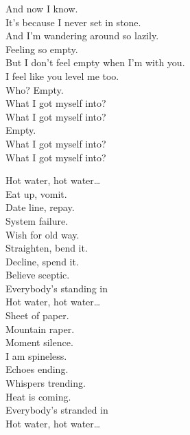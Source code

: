 And now I know. \\
It's because I never set in stone. \\
And I'm wandering around so lazily. \\
Feeling so empty. \\

But I don't feel empty when I'm with you. \\
I feel like you level me too. \\
Who? Empty. \\

What I got myself into? \\
What I got myself into? \\
Empty. \\

What I got myself into? \\
What I got myself into? \\





Hot water, hot water… \\

Eat up, vomit. \\
Date line, repay. \\
System failure. \\
Wish for old way. \\
Straighten, bend it. \\
Decline, spend it. \\
Believe sceptic. \\
Everybody's standing in \\

Hot water, hot water… \\

Sheet of paper. \\
Mountain raper. \\
Moment silence. \\
I am spineless. \\
Echoes ending. \\
Whispers trending. \\
Heat is coming. \\
Everybody's stranded in \\

Hot water, hot water… \\

